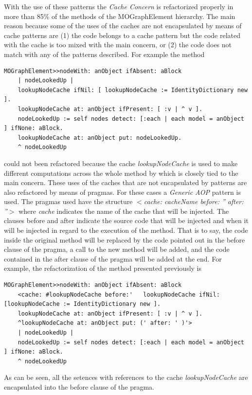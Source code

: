 \documentclass[runningheads]{llncs}
\begin{document}
With the use of these patterns the \emph{Cache Concern} is refactorized
properly in more than 85\% of the methods of the MOGraphElement hierarchy.
The main reason because some of the uses of the caches are not encapsulated by means of 
cache patterns are (1) the code belongs to a cache pattern but the code related with the cache is too mixed 
with the main concern, or (2) the code does not match with any of the patterns described. For example the method
\begin{lstlisting} 
MOGraphElement>>nodeWith: anObject ifAbsent: aBlock  
	| nodeLookedUp |
	lookupNodeCache ifNil: [ lookupNodeCache := IdentityDictionary new ].
	lookupNodeCache at: anObject ifPresent: [ :v | ^ v ].
	nodeLookedUp := self nodes detect: [:each | each model = anObject ] ifNone: aBlock.
	lookupNodeCache at: anObject put: nodeLookedUp.
	^ nodeLookedUp
\end{lstlisting}
could not been refactored because the cache \emph{lookupNodeCache} is used to make different computations across the whole
method by which is closely tied to the main concern. 
These uses of the caches that are not encapsulated
by patterns are also refactored by means of pragmas. For these cases
a \emph{Generic AOP} pattern is used. The pragmas used have the structure
\emph{$<$cache: cacheName before: '' after: ''$>$} where \emph{cache}
indicates the name of the cache that will be injected. The clauses
before and after indicate the source code that will be injected and
when it will be injected in regard to the execution of the method.
That is to say, the code inside the original method will be replaced
by the code pointed out in the before clause of the pragma, a call
to the new method will be added, and the code contained in the after
clause of the pragma will be added at the end. For example, the refactorization of the method presented previously is
\begin{lstlisting} 
MOGraphElement>>nodeWith: anObject ifAbsent: aBlock  
	<cache: #lookupNodeCache before:'	lookupNodeCache ifNil: [lookupNodeCache := IdentityDictionary new ]. 			
	lookupNodeCache at: anObject ifPresent: [ :v | ^ v ]. 
	^lookupNodeCache at: anObject put: (' after: ' )'>
	| nodeLookedUp |
	nodeLookedUp := self nodes detect: [:each | each model = anObject ] ifNone: aBlock.
	^ nodeLookedUp
\end{lstlisting}
As can be seen, all the setences with references to the cache  \emph{lookupNodeCache} are encapsulated into the before clause of the pragma.

\end{document}

